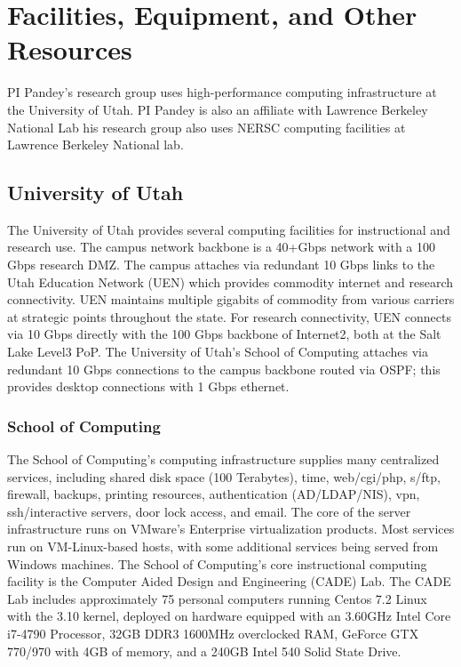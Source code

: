 
\section*{Facilities, Equipment, and Other Resources}

PI Pandey's research group uses high-performance computing infrastructure at the University of Utah. PI Pandey is also an affiliate with Lawrence Berkeley National Lab his research group also uses NERSC computing facilities at Lawrence Berkeley National lab.

\subsection*{University of Utah}
The University of Utah provides several computing facilities for instructional and research use. The campus network backbone is a 40+Gbps network with a 100 Gbps research DMZ. The campus attaches via redundant 10 Gbps links to the Utah Education Network (UEN) which provides commodity internet and research connectivity. UEN maintains multiple gigabits of commodity from various carriers at strategic points throughout the state. For research connectivity, UEN connects via 10 Gbps directly with the 100 Gbps backbone of Internet2, both at the Salt Lake Level3 PoP. The University of Utah’s School of Computing attaches via redundant 10 Gbps connections to the campus backbone routed via OSPF; this provides desktop connections with 1 Gbps ethernet.

\subsubsection*{School of Computing}
The School of Computing’s computing infrastructure supplies many centralized services, including shared disk space (100 Terabytes), time, web/cgi/php, s/ftp, firewall, backups, printing resources, authentication (AD/LDAP/NIS), vpn, ssh/interactive servers, door lock access, and email. The core of the server infrastructure runs on VMware’s Enterprise virtualization products. Most services run on VM-Linux-based hosts, with some additional services being served from Windows machines. The School of Computing’s core instructional computing facility is the Computer Aided Design and Engineering (CADE) Lab. The CADE Lab includes approximately 75 personal computers running Centos 7.2 Linux with the 3.10 kernel, deployed on hardware equipped with an 3.60GHz Intel Core i7-4790 Processor, 32GB DDR3 1600MHz overclocked RAM, GeForce GTX 770/970 with 4GB of memory, and a 240GB Intel 540 Solid State Drive.


